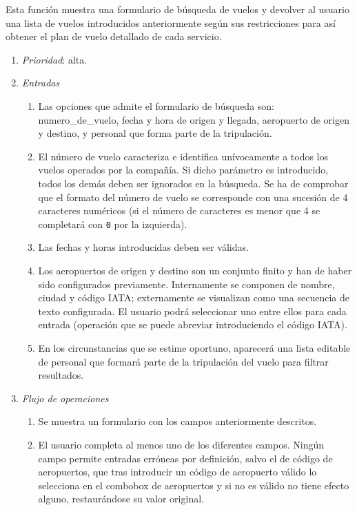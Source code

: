 

	Esta función muestra una formulario de búsqueda de vuelos y devolver al usuario una lista de vuelos introducidos anteriormente según sus restricciones para así obtener el plan de vuelo detallado de cada servicio.

	\begin{enumerate}
		\item \textit{Prioridad}: alta.
		\item \textit{Entradas}
		\begin{enumerate}
			\item Las opciones que admite el formulario de búsqueda son: \gls{numero_de_vuelo}, fecha y hora de origen y llegada, aeropuerto de origen y destino, y personal que forma parte de la tripulación.
			\item El número de vuelo caracteriza e identifica unívocamente a todos los vuelos operados por la compañía. Si dicho parámetro es introducido, todos los demás deben ser ignorados en la búsqueda. Se ha de comprobar que el formato del número de vuelo se corresponde con una sucesión de 4 caracteres numéricos (si el número de caracteres es menor que 4 se completará con \verb|0| por la izquierda).
			\item Las fechas y horas introducidas deben ser válidas.
			\item Los aeropuertos de origen y destino son un conjunto finito y han de haber sido configurados previamente. Internamente se componen de nombre, ciudad y código \gls{IATA}; externamente se visualizan como una secuencia de texto configurada. El usuario podrá seleccionar uno entre ellos para cada entrada (operación que se puede abreviar introduciendo el código IATA).
			\item En los circunstancias que se estime oportuno, aparecerá una lista editable de personal que formará parte de la tripulación del vuelo para filtrar resultados.
		\end{enumerate}
		\item \textit{Flujo de operaciones}
		\begin{enumerate}
			\item Se muestra un formulario con los campos anteriormente descritos.
			\item El usuario completa al menos uno de los diferentes campos. Ningún campo permite entradas erróneas por definición, salvo el de código de aeropuertos, que tras introducir un código de aeropuerto válido lo selecciona en el \gls{combobox} de aeropuertos y si no es válido no tiene efecto alguno, restaurándose su valor original.

\end{enumerate}
\end{enumerate}
